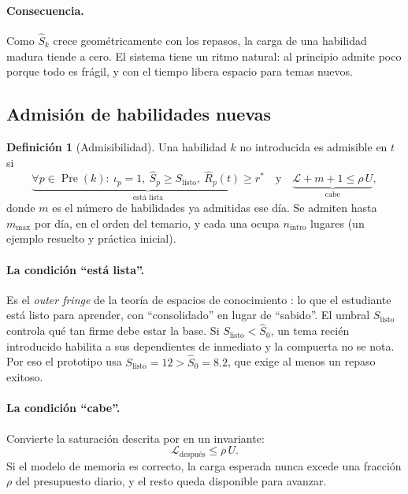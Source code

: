 \documentclass[11pt]{article}
\theoremstyle{definition}
\newtheorem{definicion}{Definición}
\theoremstyle{remark}
\newcommand{\Pre}{\operatorname{Pre}}
\newcommand{\Rh}{\hat R}
\newcommand{\Sh}{\hat S}
\newcommand{\rstar}{r^{\ast}}
\newcommand{\Slisto}{S_{\mathrm{listo}}}
\newcommand{\Carga}{\mathcal L}
\begin{document}
\paragraph{Consecuencia.} Como $\Sh_k$ crece geométricamente con los repasos, la carga de una habilidad madura tiende a cero. El sistema tiene un ritmo natural: al principio admite poco porque todo es frágil, y con el tiempo libera espacio para temas nuevos.

\subsection{Admisión de habilidades nuevas}

\begin{definicion}[Admisibilidad]
Una habilidad $k$ no introducida es admisible en $t$ si
\begin{equation}
\underbrace{\forall p\in\Pre(k):\ \iota_p=1,\ \Sh_p\ge\Slisto,\ \Rh_p(t)\ge\rstar}_{\text{está lista}}
\quad\text{y}\quad
\underbrace{\Carga+m+1\le\rho\,U}_{\text{cabe}},
\label{eq:admision}
\end{equation}
donde $m$ es el número de habilidades ya admitidas ese día. Se admiten hasta $m_{\max}$ por día, en el orden del temario, y cada una ocupa $n_{\mathrm{intro}}$ lugares (un ejemplo resuelto y práctica inicial).
\end{definicion}

\paragraph{La condición ``está lista''.} Es el \emph{outer fringe} de la teoría de espacios de conocimiento \citep{doignon1985}: lo que el estudiante está listo para aprender, con ``consolidado'' en lugar de ``sabido''. El umbral $\Slisto$ controla qué tan firme debe estar la base. Si $\Slisto<\Sh_0$, un tema recién introducido habilita a sus dependientes de inmediato y la compuerta no se nota. Por eso el prototipo usa $\Slisto=12>\Sh_0=8.2$, que exige al menos un repaso exitoso.

\paragraph{La condición ``cabe''.} Convierte la saturación descrita por \citet{reddy2016} en un invariante:
\begin{equation}
\Carga_{\text{después}}\le\rho\,U .
\label{eq:carga-cond}
\end{equation}
Si el modelo de memoria es correcto, la carga esperada nunca excede una fracción $\rho$ del presupuesto diario, y el resto queda disponible para avanzar.
\end{document}
